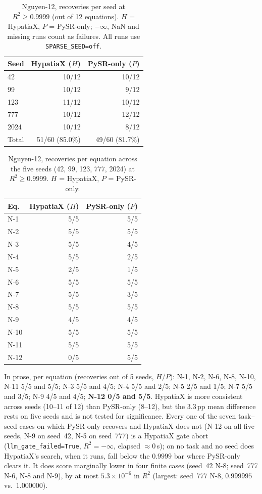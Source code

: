 \documentclass[twoside,11pt]{article}
\newcommand{\Rsq}{R^{2}}
\begin{document}
\begin{table}[h]
\centering
\caption{Nguyen-12, recoveries per seed at $\Rsq\ge0.9999$ (out of 12 equations). $H$ = HypatiaX, $P$ = PySR-only; $-\infty$, NaN and missing runs count as failures. All runs use \texttt{SPARSE\_SEED=off}.}
\label{tab:nguyen12_fiveseed}
\begin{tabular}{lrr}
\toprule
Seed & HypatiaX ($H$) & PySR-only ($P$) \\
\midrule
42 & 10/12 & 10/12 \\
99 & 10/12 & 9/12 \\
123 & 11/12 & 10/12 \\
777 & 10/12 & 12/12 \\
2024 & 10/12 & 8/12 \\
\midrule
Total & 51/60 (85.0\%) & 49/60 (81.7\%) \\
\bottomrule
\end{tabular}
\end{table}

\begin{table}[h]
\centering
\caption{Nguyen-12, recoveries per equation across the five seeds (42, 99, 123, 777, 2024) at $\Rsq\ge0.9999$. $H$ = HypatiaX, $P$ = PySR-only.}
\label{tab:nguyen12_byeq}
\begin{tabular}{lrr}
\toprule
Eq. & HypatiaX ($H$) & PySR-only ($P$) \\
\midrule
N-1 & 5/5 & 5/5 \\
N-2 & 5/5 & 5/5 \\
N-3 & 5/5 & 4/5 \\
N-4 & 5/5 & 2/5 \\
N-5 & 2/5 & 1/5 \\
N-6 & 5/5 & 5/5 \\
N-7 & 5/5 & 3/5 \\
N-8 & 5/5 & 5/5 \\
N-9 & 4/5 & 4/5 \\
N-10 & 5/5 & 5/5 \\
N-11 & 5/5 & 5/5 \\
N-12 & 0/5 & 5/5 \\
\bottomrule
\end{tabular}
\end{table}

In prose, per equation (recoveries out of 5 seeds, $H$/$P$): N-1, N-2, N-6, N-8, N-10, N-11
5/5 and 5/5; N-3 5/5 and 4/5; N-4 5/5 and 2/5; N-5 2/5 and 1/5; N-7 5/5 and 3/5;
N-9 4/5 and 4/5; \textbf{N-12 0/5 and 5/5}. HypatiaX is more consistent across
seeds (10--11 of 12) than PySR-only (8--12), but the 3.3\,pp mean difference
rests on five seeds and is not tested for significance. Every one of the seven task--seed cases on which
PySR-only recovers and HypatiaX does not (N-12 on all five seeds, N-9 on seed~42, N-5 on seed~777) is a HypatiaX gate abort (\texttt{llm\_gate\_failed=True},
$\Rsq=-\infty$, elapsed $\approx0$\,s); on no task and no seed does HypatiaX's search,
when it runs, fall below the $0.9999$ bar where PySR-only clears it. It does score marginally lower in four finite
cases (seed~42 N-8; seed~777 N-6, N-8 and N-9), by at most $5.3\times10^{-6}$ in $\Rsq$ (largest: seed~777 N-8,
$0.999995$ vs.\ $1.000000$).
\end{document}
